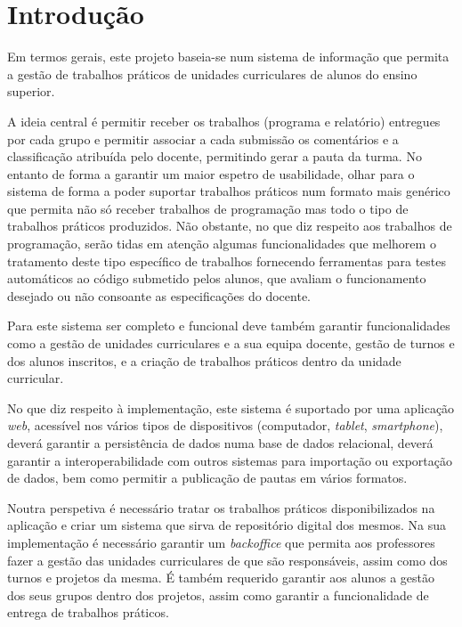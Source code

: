 \section{Introdução}

Em termos gerais, este projeto baseia-se num sistema de informação que permita a gestão de trabalhos 
práticos de unidades curriculares de alunos do ensino superior.

A ideia central é permitir receber os trabalhos (programa e relatório) entregues por cada grupo e 
permitir associar a cada submissão os comentários e a classificação atribuída pelo docente, 
permitindo gerar a pauta da turma. No entanto de forma a garantir um maior 
espetro de usabilidade, olhar para o sistema de forma a poder suportar 
trabalhos práticos num formato mais genérico que permita não só receber 
trabalhos de programação mas todo o tipo de trabalhos práticos produzidos.
Não obstante, no que diz respeito aos trabalhos de programação, serão tidas em 
atenção algumas funcionalidades que melhorem o tratamento deste tipo específico 
de trabalhos fornecendo ferramentas para testes automáticos ao código submetido 
pelos alunos, que avaliam o funcionamento desejado ou não consoante as 
especificações do docente.

Para este sistema ser completo e funcional deve também garantir funcionalidades como
a gestão de unidades curriculares e a sua equipa docente,  gestão de turnos e dos alunos inscritos, e a
criação de trabalhos práticos dentro da unidade curricular.

No que diz respeito à implementação, este sistema é suportado por uma aplicação \textit{web}, acessível
nos vários tipos de dispositivos (computador, \textit{tablet}, \textit{smartphone}), deverá garantir a persistência de 
dados numa base de dados relacional, deverá garantir a interoperabilidade com outros sistemas para
importação ou exportação de dados, bem como permitir a publicação de pautas em vários formatos.

Noutra perspetiva é necessário tratar os trabalhos práticos disponibilizados na aplicação
e criar um sistema que sirva de repositório digital dos mesmos. Na sua implementação é necessário
garantir um \textit{backoffice} que permita aos professores fazer a gestão das unidades curriculares
de que são responsáveis, assim como dos turnos e projetos da mesma. É também requerido garantir
aos alunos a gestão dos seus grupos dentro dos projetos, assim como garantir a funcionalidade
de entrega de trabalhos práticos.
 
